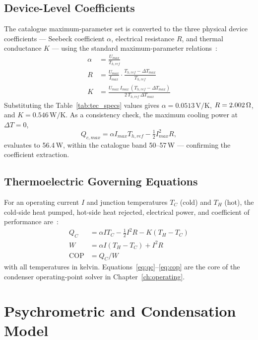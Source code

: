 \documentclass[12pt,a4paper]{report}
\newcommand{\SI}[2]{#1\,\mbox{#2}}
\newcommand{\SIrange}[3]{#1--#2\,\mbox{#3}}
\newcommand{\per}{/}
\newcommand{\volt}{V}\newcommand{\ohm}{\ensuremath{\Omega}}
\newcommand{\kelvin}{K}
\newcommand{\watt}{W}\newcommand{\Wh}{Wh}\newcommand{\kWh}{kWh}
\begin{document}
\section{Device-Level Coefficients}
The catalogue maximum-parameter set is converted to the three physical device
coefficients --- Seebeck coefficient $\alpha$, electrical resistance $R$, and
thermal conductance $K$ --- using the standard maximum-parameter
relations~\cite{zhao2022teccondenser,riffat2003peltier}:
\begin{align}
  \alpha &= \frac{U_{max}}{T_{h,ref}}\label{eq:alpha}\\[2pt]
  R      &= \frac{U_{max}}{I_{max}}\cdot\frac{T_{h,ref}-\Delta T_{max}}{T_{h,ref}}\label{eq:R}\\[2pt]
  K      &= \frac{U_{max}\,I_{max}\,(T_{h,ref}-\Delta T_{max})}{2\,T_{h,ref}\,\Delta T_{max}}\label{eq:K}
\end{align}
Substituting the Table~\ref{tab:tec_specs} values gives
$\alpha = \SI{0.0513}{\volt\per\kelvin}$,
$R = \SI{2.002}{\ohm}$, and
$K = \SI{0.546}{\watt\per\kelvin}$.
As a consistency check, the maximum cooling power at $\Delta T = 0$,
\begin{equation}
  Q_{c,max} = \alpha I_{max} T_{h,ref} - \tfrac{1}{2}I_{max}^2 R,
  \label{eq:qcmax}
\end{equation}
evaluates to \SI{56.4}{\watt}, within the catalogue band \SIrange{50}{57}{\watt}
--- confirming the coefficient extraction.

\section{Thermoelectric Governing Equations}
For an operating current $I$ and junction temperatures $T_C$ (cold) and $T_H$
(hot), the cold-side heat pumped, hot-side heat rejected, electrical power, and
coefficient of performance are~\cite{eslami2021tec,shourideh2021tec}:
\begin{align}
  Q_C &= \alpha I T_C - \tfrac{1}{2}I^2 R - K(T_H-T_C) \label{eq:qc}\\
  W   &= \alpha I (T_H-T_C) + I^2 R \label{eq:work}\\
  \mathrm{COP} &= Q_C / W \label{eq:cop}
\end{align}
with all temperatures in kelvin. Equations~\eqref{eq:qc}--\eqref{eq:cop} are the
core of the condenser operating-point solver in Chapter~\ref{ch:operating}.

\chapter{Psychrometric and Condensation Model}
\label{ch:psychro}
\end{document}

